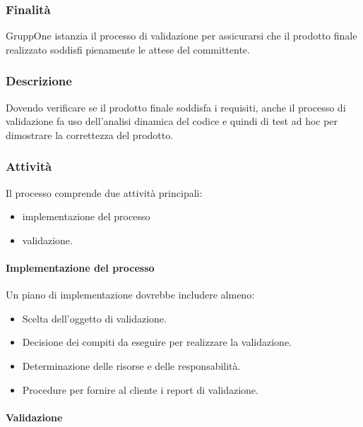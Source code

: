 \documentclass[../../norme-di-progetto.tex]{subfiles}
\begin{document}
\subsubsection{Finalità}%
\label{subs:validazione/finalita}

GruppOne istanzia il processo di validazione per assicurarsi che il prodotto finale realizzato soddisfi pienamente le attese del committente.

\subsubsection{Descrizione}%
\label{subs:validazione/descrizione}

Dovendo verificare se il prodotto finale soddisfa i requisiti, anche il processo di validazione fa uso dell'analisi dinamica del codice e quindi di test ad hoc per dimostrare la correttezza del prodotto.

\subsubsection{Attività}%
\label{subs:attivita}

Il processo comprende due attività principali:

\begin{itemize}
\item implementazione del processo
\item validazione.
\end{itemize}

\paragraph{Implementazione del processo}%
\label{subs:validazione/implementazione}

Un piano di implementazione dovrebbe includere almeno:
\begin{itemize}
  \item Scelta dell'oggetto di validazione.
  \item Decisione dei compiti da eseguire per realizzare la validazione.
  \item Determinazione delle risorse e delle responsabilità.
  \item Procedure per fornire al cliente i report di validazione.
\end{itemize}

\paragraph{Validazione}%
\label{par:validazione}
\end{document}
